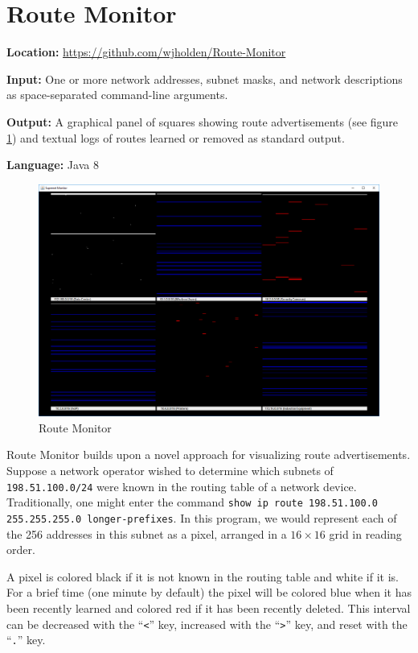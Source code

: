 \documentclass[12pt]{article}
\begin{document}
\section{Route Monitor}

\noindent \textbf{Location:} \url{https://github.com/wjholden/Route-Monitor}

\noindent \textbf{Input:} One or more network addresses, subnet masks, and network descriptions as space-separated command-line arguments.

\noindent \textbf{Output:} A graphical panel of squares showing route advertisements (see figure \ref{fig:Route-Monitor-1}) and textual logs of routes learned or removed as standard output.

\noindent \textbf{Language:} Java 8

\begin{figure}[h]
\centering
\includegraphics[width=.80\textwidth]{Route-Monitor-1}
\caption{Route Monitor}
\label{fig:Route-Monitor-1}
\end{figure}

Route Monitor builds upon a novel approach for visualizing route advertisements.
Suppose a network operator wished to determine which subnets of \texttt{198.51.100.0/24} were known in the routing table of a network device.
Traditionally, one might enter the command \texttt{show ip route 198.51.100.0 255.255.255.0 longer-prefixes}.
In this program, we would represent each of the 256 addresses in this subnet as a pixel, arranged in a $16 \times 16$ grid in reading order.

A pixel is colored black if it is not known in the routing table and white if it is.
For a brief time (one minute by default) the pixel will be colored blue when it has been recently learned and colored red if it has been recently deleted.
This interval can be decreased with the ``\texttt{<}'' key, increased with the ``\texttt{>}'' key, and reset with the ``\texttt{.}'' key.
\end{document}

